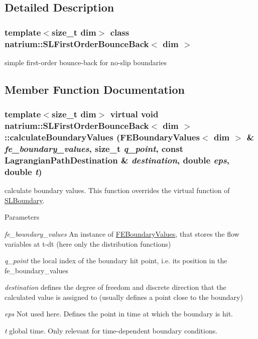 \subsection{Detailed Description}
\subsubsection*{template$<$size\_\-t dim$>$ class natrium::SLFirstOrderBounceBack$<$ dim $>$}

simple first-\/order bounce-\/back for no-\/slip boundaries 

\subsection{Member Function Documentation}
\hypertarget{classnatrium_1_1SLFirstOrderBounceBack_a0ff05e7fd8cd657f77fd9636c7a55e60}{
\subsubsection[{calculateBoundaryValues}]{\setlength{\rightskip}{0pt plus 5cm}template$<$size\_\-t dim$>$ virtual void {\bf natrium::SLFirstOrderBounceBack}$<$ dim $>$::calculateBoundaryValues ({\bf FEBoundaryValues}$<$ dim $>$ \& {\em fe\_\-boundary\_\-values}, \/  size\_\-t {\em q\_\-point}, \/  const {\bf LagrangianPathDestination} \& {\em destination}, \/  double {\em eps}, \/  double {\em t})}}
\label{classnatrium_1_1SLFirstOrderBounceBack_a0ff05e7fd8cd657f77fd9636c7a55e60}


calculate boundary values. This function overrides the virtual function of \hyperlink{classnatrium_1_1SLBoundary}{SLBoundary}. 
\begin{DoxyParams}{Parameters}
\item[{\em fe\_\-boundary\_\-values}]An instance of \hyperlink{classnatrium_1_1FEBoundaryValues}{FEBoundaryValues}, that stores the flow variables at t-\/dt (here only the distribution functions) \item[{\em q\_\-point}]the local index of the boundary hit point, i.e. its position in the fe\_\-boundary\_\-values \item[{\em destination}]defines the degree of freedom and discrete direction that the calculated value is assigned to (usually defines a point close to the boundary) \item[{\em eps}]Not used here. Defines the point in time at which the boundary is hit. \item[{\em t}]global time. Only relevant for time-\/dependent boundary conditions. \end{DoxyParams}


